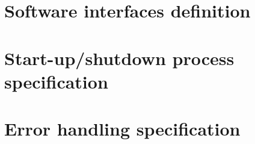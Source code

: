 \section{Software interfaces definition}
\label{sec:sw-interf-def}
%
% 

\section{Start-up/shutdown process specification}
\label{sec:startup-shutdown}

\section{Error handling specification}
\label{sec:error-handling-specification}
%
%
